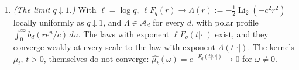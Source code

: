 \begin{theorem}
\begin{enumerate}
$\partial_t(\mu_t * f) = \mathcal{H}_t(\mu_t * f)$ almost everywhere, with
$\mathcal{H}_t = \frac2t\sum_{i \ge 1}(L_{ctq^{-i}} - I)$, a series of bounded operators on
$L^1(\RR^d)$ that converges absolutely in $L^1$ on $W^{2,1}(\RR^d)$ and whose sum is not bounded in
the $L^1$ norm.
\item \emph{(The limit $q \downarrow 1$.)} With $\ell = \log q$, $\ell F_q(r) \to \Lambda(r) :=
-\tfrac12\operatorname{Li}_2(-c^2r^2)$ locally uniformly as $q \downarrow 1$, and
$\Lambda \in \mathcal{A}_d$ for every $d$, with polar profile $\int_0^\infty b_d(re^u/c)\,du$. The
laws with exponent $\ell F_q(t|\cdot|)$ exist, and they converge weakly at every scale to the law
with exponent $\Lambda(t|\cdot|)$. The kernels $\mu_t$, $t > 0$, themselves do not converge:
$\widehat{\mu_t}(\omega) = e^{-F_q(t|\omega|)} \to 0$ for $\omega \ne 0$.
\end{enumerate}
\end{theorem}

